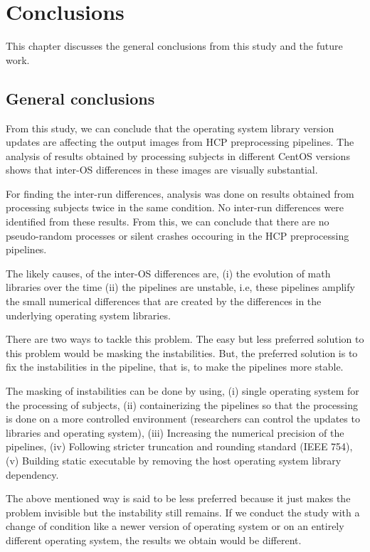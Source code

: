 \chapter{Conclusions}\label{conclusion}
This chapter discusses the general conclusions from this study and the future work.

\section{General conclusions}
From this study, we can conclude that the operating system library version updates are affecting the output images from HCP preprocessing pipelines. The analysis of results obtained by processing subjects in different CentOS versions shows that inter-OS differences in these images are visually substantial.

For finding the inter-run differences, analysis was done on results obtained from processing subjects twice in the same condition. No inter-run differences were identified from these results. From this, we can conclude that there are no pseudo-random processes or silent crashes occouring in the HCP preprocessing pipelines.

The likely causes, of the inter-OS differences are, (i) the evolution of math libraries over the time (ii) the pipelines are unstable, i.e, these pipelines amplify the small numerical differences that are created by the differences in the underlying operating system libraries.

There are two ways to tackle this problem. The easy but less preferred solution to this problem would be masking the instabilities. But, the preferred solution is to fix the instabilities in the pipeline, that is, to make the pipelines more stable.

The masking of instabilities can be done by using, (i) single operating system for the processing of subjects, (ii) containerizing the pipelines so that the processing is done on a more controlled environment (researchers can control the updates to libraries and operating system), (iii) Increasing the numerical precision of the pipelines, (iv) Following stricter truncation and rounding standard (IEEE 754), (v) Building static executable by removing the host operating system library dependency.

The above mentioned way is said to be less preferred because it just makes the problem invisible but the instability still remains. If we conduct the study with a change of condition like a newer version of operating system or on an entirely different operating system, the results we obtain would be different.

